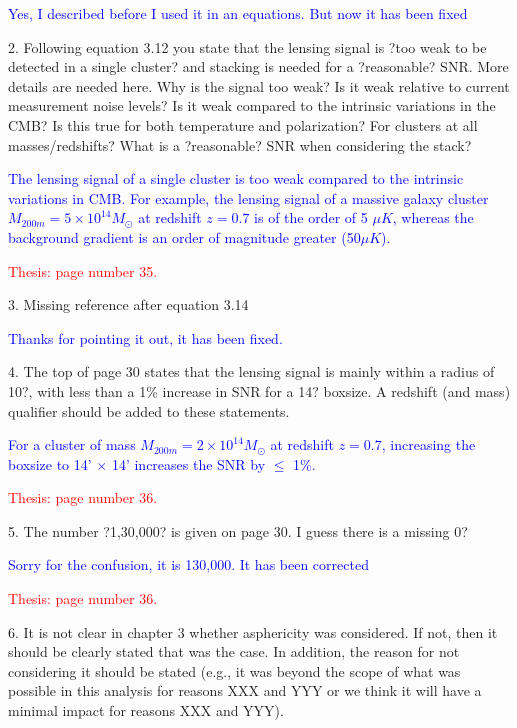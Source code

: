 \documentclass[11pt,a4paper]{article}
\begin{document}
\textcolor{blue}{Yes, I described before I used it in an equations. But now it has been fixed}

2. Following equation 3.12 you state that the lensing signal is ?too weak to be
detected in a single cluster? and stacking is needed for a ?reasonable? SNR.
More details are needed here. Why is the signal too weak? Is it weak relative to
current measurement noise levels? Is it weak compared to the intrinsic variations
in the CMB? Is this true for both temperature and polarization? For clusters at all
masses/redshifts? What is a ?reasonable? SNR when considering the stack?

\textcolor{blue}{The lensing signal of a single cluster is too weak compared to the intrinsic variations in CMB.  %
  For example, the lensing signal of a massive galaxy cluster $M_{200m} = 5 \times 10^{14} M_{\odot}$ at redshift $z = 0.7$ is of the order of 5 $\mu K$, whereas the background gradient is an order of magnitude greater (50$\mu K$).}
  
\textcolor{red}{Thesis: page number 35.}

3. Missing reference after equation 3.14

\textcolor{blue}{Thanks for pointing it out, it has been fixed.}

4. The top of page 30 states that the lensing signal is mainly within a radius of 10?,
with less than a 1\% increase in SNR for a 14? boxsize. A redshift (and mass)
qualifier should be added to these statements.

\textcolor{blue}{For a cluster of mass $M_{200m} = 2 \times 10^{14} M_{\odot}$ at redshift $z = 0.7$, increasing the boxsize to 14' $\times$ 14'  increases the SNR by $\le$ 1\%.}

\textcolor{red}{Thesis: page number 36.}


5. The number ?1,30,000? is given on page 30. I guess there is a missing 0?

\textcolor{blue}{Sorry for the confusion, it is 130,000. It has been corrected}

\textcolor{red}{Thesis: page number 36.}

6. It is not clear in chapter 3 whether asphericity was considered. If not, then it
should be clearly stated that was the case. In addition, the reason for not
considering it should be stated (e.g., it was beyond the scope of what was
possible in this analysis for reasons XXX and YYY or we think it will have a
minimal impact for reasons XXX and YYY).
\end{document}
